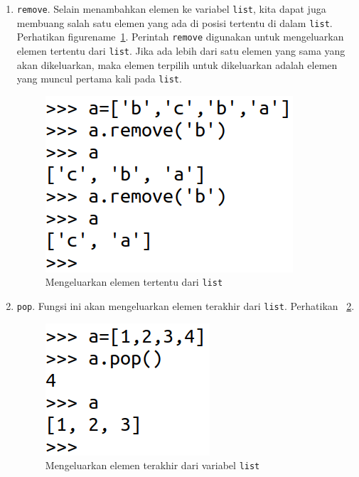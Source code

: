 \begin{enumerate}
\item \texttt{remove}. Selain menambahkan elemen ke variabel \texttt{list}, kita dapat juga membuang salah satu elemen yang ada di posisi tertentu di dalam \texttt{list}. Perhatikan figurename~\ref{fig:remove}. Perintah \texttt{remove} digunakan untuk mengeluarkan elemen tertentu dari \texttt{list}. Jika ada lebih dari satu elemen yang sama yang akan dikeluarkan, maka elemen terpilih untuk dikeluarkan adalah elemen yang muncul pertama kali pada \texttt{list}.

\begin{figure}[h!]
  \begin{center}
    \includegraphics[scale=1.25]{pics/remove.png}
    \caption{Mengeluarkan elemen tertentu dari \texttt{list}}
    \label{fig:remove}
  \end{center}
\end{figure}

\item \texttt{pop}. Fungsi ini akan mengeluarkan elemen terakhir dari \texttt{list}. Perhatikan \figurename~\ref{fig:pop}.

\begin{figure}[h!]
  \begin{center}
    \includegraphics[scale=1.25]{pics/pop.png}
    \caption{Mengeluarkan elemen terakhir dari variabel \texttt{list}}
    \label{fig:pop}
  \end{center}
\end{figure}

\end{enumerate}
